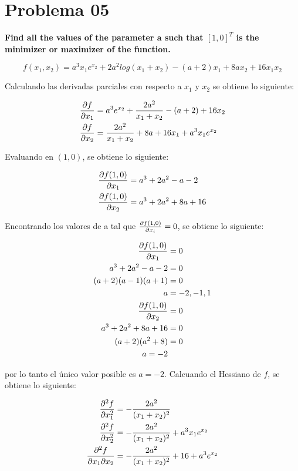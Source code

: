 \section*{Problema 05}

\textbf{Find all the values of the parameter a such that $[1, 0]^T$ is the minimizer or maximizer of the function.}

\begin{equation*}
    f(x_1,x_2) = a^3x_1 e^{x_2} +2a^2log(x_1+x_2)-(a+2)x_1 +8ax_2 +16x_1x_2
\end{equation*}

Calculando las derivadas parciales con respecto a $x_1$ y $x_2$ se obtiene lo siguiente:

\begin{align*}
    \frac{\partial f}{\partial x_1} & = a^3 e^{x_2} + \frac{2a^2}{x_1+x_2} - (a+2)+16x_2 \\
    \frac{\partial f}{\partial x_2} & = \frac{2a^2}{x_1+x_2} +8a +16x_1 +a^3x_1e^{x_2}
\end{align*}

Evaluando en $(1,0)$, se obtiene lo siguiente:

\begin{align*}
    \frac{\partial f(1,0)}{\partial x_1} & = a^3+2a^2-a-2   \\
    \frac{\partial f(1,0)}{\partial x_2} & = a^3+2a^2+8a+16
\end{align*}

Encontrando los valores de a tal que $\frac{\partial f(1,0)}{\partial x_i} = 0$, se obtiene lo siguiente:

\begin{align*}
    \frac{\partial f(1,0)}{\partial x_1} & = 0       \\
    a^3+2a^2-a-2           & = 0       \\
    (a+2)(a-1)(a+1)        & = 0       \\
    a                      & = -2,-1,1 \\
    \frac{\partial f(1,0)}{\partial x_2} & = 0       \\
    a^3+2a^2+8a+16         & = 0       \\
    (a+2)(a^2+8)           & = 0       \\
    a=-2
\end{align*}

por lo tanto el único valor posible es $a=-2$. Calcuando el Hessiano de $f$, se obtiene lo siguiente:

\begin{align*}
    \frac{\partial^2 f}{\partial x_1^2}              & = -\frac{2a^2}{(x_1+x_2)^2}                 \\
    \frac{\partial^2 f}{\partial x_2^2}              & = -\frac{2a^2}{(x_1+x_2)^2} + a^3x_1e^{x_2} \\
    \frac{\partial ^2f}{\partial x_1\partial x_2} & = - \frac{2a^2}{(x_1+x_2)^2} +16+a^3e^{x_2}
\end{align*}

